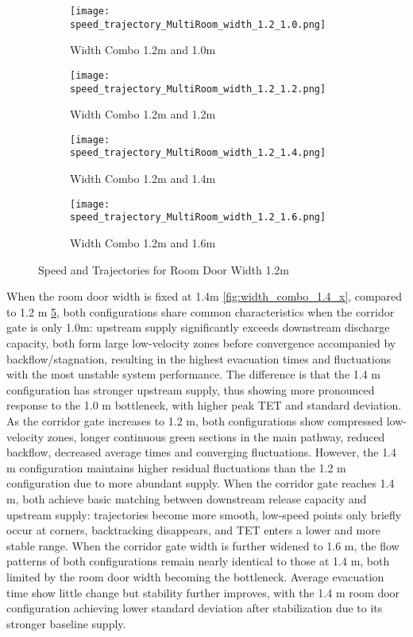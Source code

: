 \begin{figure}[h]
    \centering
    \begin{subfigure}[b]{.45\linewidth}
        \texttt{[image: 
            speed\_trajectory\_MultiRoom\_width\_1.2\_1.0.png]}
        \caption{Width Combo 1.2m and 1.0m}
        \label{fig:width_combo_1.2_1.0m}
    \end{subfigure}
    \begin{subfigure}[b]{.45\linewidth}
        \texttt{[image: 
            speed\_trajectory\_MultiRoom\_width\_1.2\_1.2.png]}
        \caption{Width Combo 1.2m and 1.2m}
        \label{fig:width_combo_1.2_1.2m}
    \end{subfigure}

    \begin{subfigure}[b]{.45\linewidth}
        \texttt{[image: 
            speed\_trajectory\_MultiRoom\_width\_1.2\_1.4.png]}
        \caption{Width Combo 1.2m and 1.4m}
        \label{fig:width_combo_1.2_1.4m}
    \end{subfigure}
    \begin{subfigure}[b]{.45\linewidth}
        \texttt{[image: 
            speed\_trajectory\_MultiRoom\_width\_1.2\_1.6.png]}
        \caption{Width Combo 1.2m and 1.6m}
        \label{fig:width_combo_1.2_1.6m}
    \end{subfigure}

    \caption{Speed and Trajectories for Room Door Width 1.2m}
    \label{fig:width_combo_1.2_x}
\end{figure}

When the room door width is fixed at 1.4m \ref{fig:width_combo_1.4_x}, compared to 1.2 m \ref{fig:width_combo_1.2_x}, both configurations share common characteristics when the corridor gate is only 1.0m: upstream supply significantly exceeds downstream discharge capacity, both form large low-velocity zones before convergence accompanied by backflow/stagnation, resulting in the highest evacuation times and fluctuations with the most unstable system performance. The difference is that the 1.4 m configuration has stronger upstream supply, thus showing more pronounced response to the 1.0 m bottleneck, with higher peak TET and standard deviation. As the corridor gate increases to 1.2 m, both configurations show compressed low-velocity zones, longer continuous green sections in the main pathway, reduced backflow, decreased average times and converging fluctuations. However, the 1.4 m configuration maintains higher residual fluctuations than the 1.2 m configuration due to more abundant supply. When the corridor gate reaches 1.4 m, both achieve basic matching between downstream release capacity and upstream supply: trajectories become more smooth, low-speed points only briefly occur at corners, backtracking disappears, and TET enters a lower and more stable range. When the corridor gate width is further widened to 1.6 m, the flow patterns of both configurations remain nearly identical to those at 1.4 m, both limited by the room door width becoming the bottleneck. Average evacuation time show little change but stability further improves, with the 1.4 m room door configuration achieving lower standard deviation after stabilization due to its stronger baseline supply.

